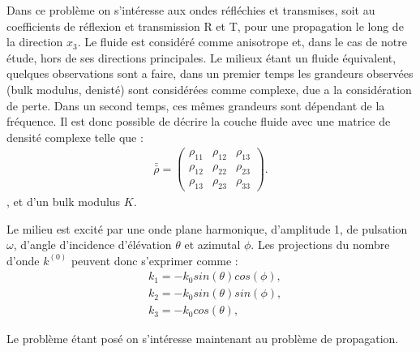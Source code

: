 \documentclass[12pt]{report}
\begin{document}
    Dans ce problème on s'intéresse aux ondes réfléchies et transmises, soit au coefficients de réflexion et transmission R et T, pour une propagation le long de la direction $x_3$.
    Le fluide est considéré comme anisotrope et, dans le cas de notre étude, hors de ses directions principales. Le milieux étant un fluide équivalent, quelques observations sont a faire, dans un premier temps les grandeurs observées (bulk modulus, denisté) sont considérées comme complexe, due a la considération de perte. Dans un second temps, ces mêmes grandeurs sont dépendant de la fréquence.
    Il est donc possible de décrire la couche fluide avec une matrice de densité complexe telle que :
    \begin{align}
    \bar{\bar{\rho}}=\begin{pmatrix}
    					\rho_{11} & \rho_{12} & \rho_{13} \\
                        \rho_{12} & \rho_{22} & \rho_{23} \\
                        \rho_{13} & \rho_{23} & \rho_{33}                       
    				 \end{pmatrix}.
    \end{align},
    et d'un bulk modulus $K$.
    
    Le milieu est excité par une onde plane harmonique, d'amplitude 1, de pulsation $\omega$, d'angle d'incidence d'élévation $\theta$ et azimutal $\phi$. Les projections du nombre d'onde $k^{(0)}$ peuvent donc s'exprimer comme : 
    \begin{align}
    &k_1=-k_0 sin(\theta) cos(\phi),\label{k1} \\
    &k_2=-k_0 sin(\theta) sin(\phi),\label{k2} \\
    &k_3= -k_0 cos(\theta),\label{k3}
    \end{align}
        
        Le problème étant posé on s'intéresse maintenant au problème de propagation.
        
\end{document}
